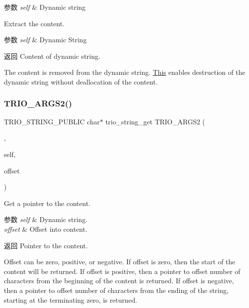 \begin{DoxyParams}{参数}
{\em self} & Dynamic string\\
\hline
\end{DoxyParams}
Extract the content.


\begin{DoxyParams}{参数}
{\em self} & Dynamic String \\
\hline
\end{DoxyParams}
\begin{DoxyReturn}{返回}
Content of dynamic string.
\end{DoxyReturn}
The content is removed from the dynamic string. \hyperlink{namespace_this}{This} enables destruction of the dynamic string without deallocation of the content. \mbox{\label{group___dynamic_strings_ga4270a9e7b524425d513dad700305121a}} 
\subsubsection{\texorpdfstring{T\+R\+I\+O\+\_\+\+A\+R\+G\+S2()}{TRIO\_ARGS2()}\hspace{0.1cm}{\footnotesize\ttfamily [1/3]}}
{\footnotesize\ttfamily T\+R\+I\+O\+\_\+\+S\+T\+R\+I\+N\+G\+\_\+\+P\+U\+B\+L\+IC char$\ast$ trio\+\_\+string\+\_\+get T\+R\+I\+O\+\_\+\+A\+R\+G\+S2 (\begin{DoxyParamCaption}\item[{(self, offset)}]{,  }\item[{\hyperlink{struct__trio__string__t}{trio\+\_\+string\+\_\+t} $\ast$}]{self,  }\item[{int}]{offset }\end{DoxyParamCaption})}

Get a pointer to the content.


\begin{DoxyParams}{参数}
{\em self} & Dynamic string. \\
\hline
{\em offset} & Offset into content. \\
\hline
\end{DoxyParams}
\begin{DoxyReturn}{返回}
Pointer to the content.
\end{DoxyReturn}
{\ttfamily Offset} can be zero, positive, or negative. If {\ttfamily offset} is zero, then the start of the content will be returned. If {\ttfamily offset} is positive, then a pointer to {\ttfamily offset} number of characters from the beginning of the content is returned. If {\ttfamily offset} is negative, then a pointer to {\ttfamily offset} number of characters from the ending of the string, starting at the terminating zero, is returned. \mbox{\label{group___dynamic_strings_ga85dae323032856f313c671ce62d969d4}} 
